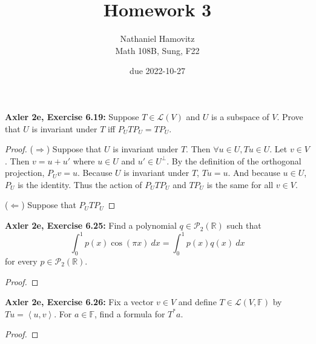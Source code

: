 \documentclass{article}
\newcommand{\R}{\mathbb{R}}
\newcommand{\F}{\mathbb{F}}
\newcommand{\iprod}[2]{\left\langle #1, #2 \right\rangle}
\begin{document}
\renewcommand{\labelenumi}{(\alph{enumi})}


\title{Homework 3} %
\author{Nathaniel Hamovitz\\Math 108B, Sung, F22}
\date{due 2022-10-27}

\maketitle


\textbf{Axler 2e, Exercise 6.19: }
Suppose $T \in \mathcal{L}(V)$ and $U$ is a subspace of $V$. Prove that $U$ is invariant under $T$ iff $P_U T P_U = T P_U$.

\begin{proof}
    ($\Longrightarrow$) Suppose that $U$ is invariant under $T$. Then $\forall u \in U, Tu \in U$. Let $v \in V$. Then $v = u + u'$ where $u \in U$ and $u' \in U^\perp$. By the definition of the orthogonal projection, $P_U v = u$. Because $U$ is invariant under $T$, $T u = u$. And because $u \in U$, $P_U$ is the identity. Thus the action of $P_U T P_U$ and $T P_U$ is the same for all $v \in V$. 

    ($\Longleftarrow$) Suppose that $P_U T P_U $
    
\end{proof}


\newpage %


\textbf{Axler 2e, Exercise 6.25: }
Find a polynomial $q \in \mathcal{P}_2(\R)$ such that
$$\int_0^1 p(x) \cos(\pi x) \: dx = \int_0^1 p(x) q(x) \: dx$$
for every $p \in \mathcal{P}_2(\R)$.

\begin{proof}
    
\end{proof}


\newpage %


\textbf{Axler 2e, Exercise 6.26: }
Fix a vector $v \in V$ and define $T \in \mathcal{L}(V, \F)$ by $Tu = \iprod{u}{v}$. For $a \in \F$, find a formula for $T^* a$.

\begin{proof}
    
\end{proof}
\end{document}
